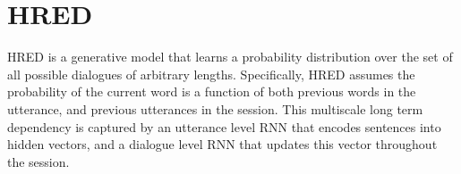\section{HRED}
HRED is a generative model that learns a probability distribution over the set of all possible dialogues of arbitrary lengths. Specifically, HRED assumes the probability of the current word is a function of both previous words in the utterance, and previous utterances in the session. This multiscale long term dependency is captured by an utterance level RNN that encodes sentences into hidden vectors, and a dialogue level RNN that updates this vector throughout the session. 
